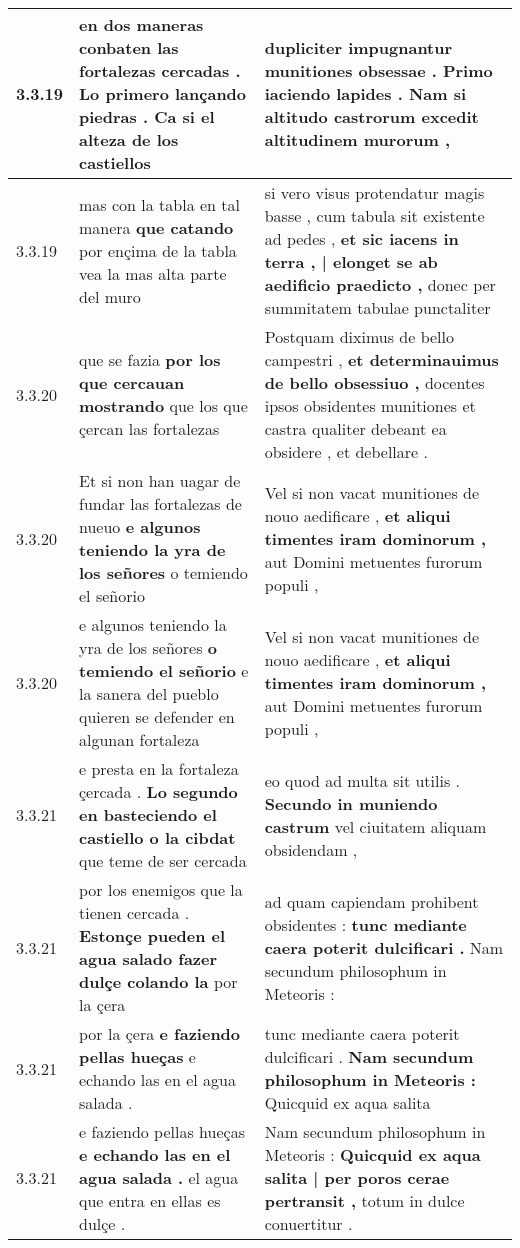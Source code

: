 \begin{tabular}{|p{1cm}|p{6.5cm}|p{6.5cm}|}
3.3.19 & en dos maneras conbaten las fortalezas cercadas . \textbf{ Lo primero lançando piedras . } Ca si el alteza de los castiellos & dupliciter impugnantur munitiones obsessae . \textbf{ Primo iaciendo lapides . } Nam si altitudo castrorum excedit altitudinem murorum , \\\hline
3.3.19 & mas con la tabla en tal manera \textbf{ que catando } por ençima de la tabla vea la mas alta parte del muro & si vero visus protendatur magis basse , cum tabula sit existente ad pedes , \textbf{ et sic iacens in terra , | elonget se ab aedificio praedicto , } donec per summitatem tabulae punctaliter \\\hline
3.3.20 & que se fazia \textbf{ por los que cercauan mostrando } que los que çercan las fortalezas & Postquam diximus de bello campestri , \textbf{ et determinauimus de bello obsessiuo , } docentes ipsos obsidentes munitiones et castra qualiter debeant ea obsidere , et debellare . \\\hline
3.3.20 & Et si non han uagar de fundar las fortalezas de nueuo \textbf{ e algunos teniendo la yra de los señores } o temiendo el señorio & Vel si non vacat munitiones de nouo aedificare , \textbf{ et aliqui timentes iram dominorum , } aut Domini metuentes furorum populi , \\\hline
3.3.20 & e algunos teniendo la yra de los señores \textbf{ o temiendo el señorio } e la sanera del pueblo quieren se defender en algunan fortaleza & Vel si non vacat munitiones de nouo aedificare , \textbf{ et aliqui timentes iram dominorum , } aut Domini metuentes furorum populi , \\\hline
3.3.21 & e presta en la fortaleza çercada . \textbf{ Lo segundo en basteciendo el castiello o la cibdat } que teme de ser cercada & eo quod ad multa sit utilis . \textbf{ Secundo in muniendo castrum } vel ciuitatem aliquam obsidendam , \\\hline
3.3.21 & por los enemigos que la tienen cercada . \textbf{ Estonçe pueden el agua salado fazer dulçe colando la } por la çera & ad quam capiendam prohibent obsidentes : \textbf{ tunc mediante caera poterit dulcificari . } Nam secundum philosophum in Meteoris : \\\hline
3.3.21 & por la çera \textbf{ e faziendo pellas hueças } e echando las en el agua salada . & tunc mediante caera poterit dulcificari . \textbf{ Nam secundum philosophum in Meteoris : } Quicquid ex aqua salita \\\hline
3.3.21 & e faziendo pellas hueças \textbf{ e echando las en el agua salada . } el agua que entra en ellas es dulçe . & Nam secundum philosophum in Meteoris : \textbf{ Quicquid ex aqua salita | per poros cerae pertransit , } totum in dulce conuertitur . \\\hline

\end{tabular}
